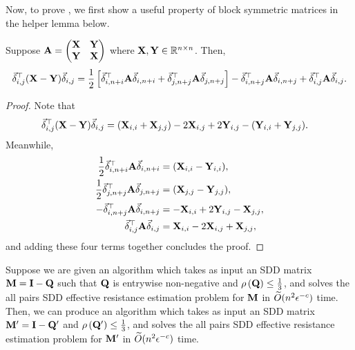Now, to prove , we first show a useful property of block symmetric matrices in the helper lemma below.
\begin{lemma}\label{lemma:lowerbound_thm2_lemma0} Suppose $\mathbf{A} = \begin{pmatrix}
    \mathbf{X} & \mathbf{Y} \\
    \mathbf{Y} & \mathbf{X}
\end{pmatrix}$ where $\mathbf{X}, \mathbf{Y} \in \mathbb{R}^{n \times n}$. Then, 
\begin{align*}
    \vec{\delta}_{i,j}^\top (\mathbf{X}-\mathbf{Y}) \vec{\delta}_{i,j} = \frac{1}{2} \left[\vec{\delta}_{i,n+i}^\top \mathbf{A} \vec{\delta}_{i,n+i} + \vec{\delta}_{j,n+j}^\top \mathbf{A} \vec{\delta}_{j,n+j}\right] - \vec{\delta}_{i,n+j}^\top \mathbf{A} \vec{\delta}_{i,n+j} + \vec{\delta}_{i,j}^\top \mathbf{A} \vec{\delta}_{i,j}. 
\end{align*}
\end{lemma}
\begin{proof} Note that 
\begin{align*}
    \vec{\delta}_{i,j}^\top (\mathbf{X}-\mathbf{Y}) \vec{\delta}_{i,j} &= (\mathbf{X}_{i,i} + \mathbf{X}_{j,j}) - 2 \mathbf{X}_{i,j} + 2\mathbf{Y}_{i,j} - (\mathbf{Y}_{i,i} + \mathbf{Y}_{j,j}). 
\end{align*}
Meanwhile, 
\begin{align*}
    \frac{1}{2} \vec{\delta}_{i,n+i}^\top \mathbf{A} \vec{\delta}_{i,n+i} &= (\mathbf{X}_{i,i} - \mathbf{Y}_{i,i}), \\
    \frac{1}{2} \vec{\delta}_{j,n+j}^\top \mathbf{A} \vec{\delta}_{j,n+j} &= (\mathbf{X}_{j,j} - \mathbf{Y}_{j,j}), \\
    -\vec{\delta}_{i, n+j}^\top \mathbf{A} \vec{\delta}_{i,n+j} &= -\mathbf{X}_{i,i} + 2 \mathbf{Y}_{i,j} - \mathbf{X}_{j,j}, \\
    \vec{\delta}_{i,j}^\top \mathbf{A} \vec{\delta}_{i,j} &= \mathbf{X}_{i,i} - 2 \mathbf{X}_{i,j} + \mathbf{X}_{j,j}, 
\end{align*}
and adding these four terms together concludes the proof. 
\end{proof}

\begin{lemma}\label{lemma:lowerbound_thm2_lemma2} Suppose we are given an algorithm which takes as input an SDD matrix $\mathbf{M} = \mathbf{I} - \mathbf{Q}$ such that $\mathbf{Q}$ is entrywise non-negative and $\rho\left( \mathbf{Q} \right) \leq \frac{1}{3}$, and solves the all pairs SDD effective resistance estimation problem for $\mathbf{M}$ in $\widetilde{O}( {n^2 \epsilon^{-c}} )$ time. Then, we can produce an algorithm which takes as input an SDD matrix $\mathbf{M}' = \mathbf{I} - \mathbf{Q}'$ and $\rho\left( \mathbf{Q}' \right) \leq \frac{1}{3}$, and solves the all pairs SDD effective resistance estimation problem for $\mathbf{M}'$ in $\widetilde{O}( {n^2 \epsilon^{-c}} )$ time.
\end{lemma}


